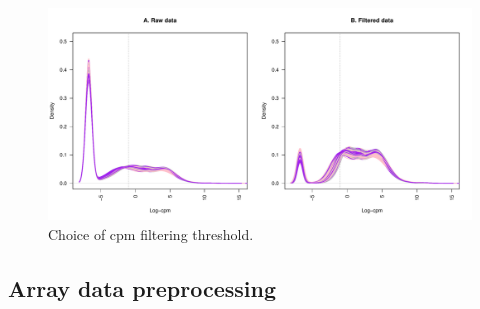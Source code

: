 \begin{figure}
    \includegraphics[width=1.0\textwidth]{./mainmatter/figures/chapter_02/rnaseq_data_setup.sample_cpm_density_filtered.pdf}
    \caption{Choice of cpm filtering threshold.}
\end{figure}

\subsection{Array data preprocessing}


